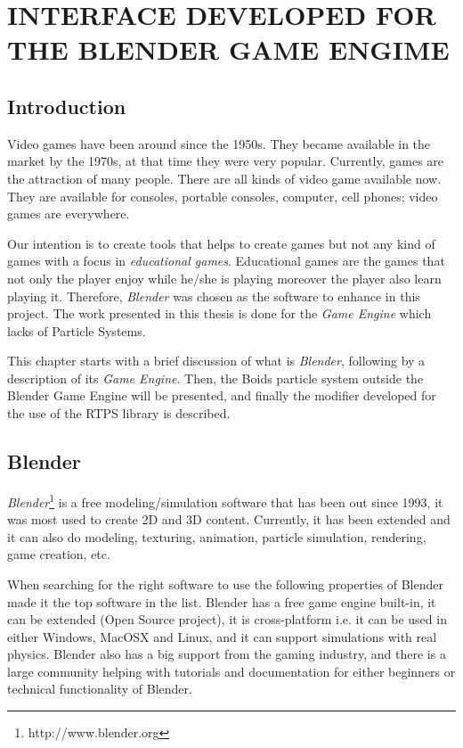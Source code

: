 \chapter{INTERFACE DEVELOPED FOR THE BLENDER GAME ENGIME}\label{chap5}

\section{Introduction}

Video games have been around since the 1950s\cite{computerVideoGamesHistory}. They became available in the market by the 1970s, at that time they were very popular. Currently, games are the attraction of many people. There are all kinds of video game available now. They are available for consoles, portable consoles, computer, cell phones; video games are everywhere. 

Our intention is to create tools that helps to create games but not any kind of games with a focus in \textit{educational games}. Educational games are the games that not only the player enjoy while he/she is playing moreover the player also learn playing it. Therefore, \textit{Blender} was chosen as the software to enhance in this project. The work presented in this thesis is done for the \textit{Game Engine} which lacks of Particle Systems.

This chapter starts with a brief discussion of what is \textit{Blender}, following by a description of its \textit{Game Engine}. Then, the Boids particle system outside the Blender Game Engine will be presented, and finally the modifier developed for the use of the RTPS library is described.

\section{Blender}\label{blenderSec}
\textit{Blender}\footnote{http://www.blender.org} is a free modeling/simulation software that has been out since 1993, it was most used to create 2D and 3D content. Currently, it has been extended and it can also do modeling, texturing, animation, particle simulation, rendering, game creation, etc.

When searching for the right software to use the following properties of Blender made it the top software in the list. Blender has a free game engine built-in, it can be extended (Open Source project), it is cross-platform i.e. it can be used in either Windows, MacOSX and Linux, and it can support simulations with real physics. Blender also has a big support from the gaming industry, and there is a large community helping with tutorials and documentation for either beginners or technical functionality of Blender.

